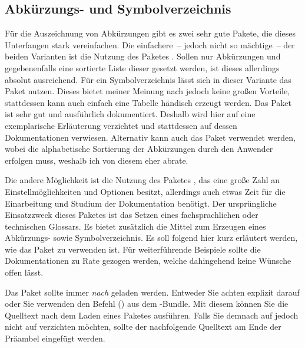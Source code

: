 \documentclass[%
  english,ngerman,%
  cdgeometry=no,DIV=12,automark,%
]{tudscrartcl}
\begin{document}
\subsection{Abkürzungs- und Symbolverzeichnis}
\label{sec:glossaries}%
%
Für die Auszeichnung von Abkürzungen gibt es zwei sehr gute Pakete, die dieses 
Unterfangen stark vereinfachen. Die einfachere~-- jedoch nicht so mächtige~-- 
der beiden Varianten ist die Nutzung des Paketes . Sollen nur 
Abkürzungen und gegebenenfalls eine sortierte Liste dieser gesetzt werden, ist 
dieses allerdings absolut ausreichend. Für ein Symbolverzeichnis lässt sich in 
dieser Variante das Paket  nutzen. Dieses bietet meiner 
Meinung nach jedoch keine großen Vorteile, stattdessen kann auch einfach eine 
Tabelle händisch erzeugt werden. Das Paket  ist sehr gut und 
ausführlich dokumentiert. Deshalb wird hier auf eine exemplarische Erläuterung 
verzichtet und stattdessen auf dessen Dokumentationen verwiesen. Alternativ 
kann auch das Paket  verwendet werden, wobei die alphabetische 
Sortierung der Abkürzungen durch den Anwender erfolgen muss, weshalb ich von 
diesem eher abrate.

Die andere Möglichkeit ist die Nutzung des Paketes , das 
eine große Zahl an Einstellmöglichkeiten und Optionen besitzt, allerdings auch 
etwas Zeit für die Einarbeitung und Studium der Dokumentation benötigt. Der 
ursprüngliche Einsatzzweck dieses Paketes ist das Setzen eines fachsprachlichen 
oder technischen Glossars. Es bietet zusätzlich die Mittel zum Erzeugen eines 
Abkürzungs- sowie Symbolverzeichnis. Es soll folgend hier kurz erläutert 
werden, wie das Paket zu verwenden ist. Für weiterführende Beispiele sollte 
die Dokumentationen zu Rate gezogen werden, welche dahingehend keine Wünsche 
offen lässt. 

Das Paket  sollte immer \emph{nach}  
geladen werden. Entweder Sie achten explizit darauf oder Sie verwenden den 
Befehl () aus dem \KOMAScript-Bundle. Mit 
diesem können Sie die Quelltext nach dem Laden eines Paketes ausführen. 
Falls Sie demnach auf  jedoch nicht auf  
verzichten möchten, sollte der nachfolgende Quelltext am Ende der Präambel 
eingefügt werden.
\end{document}
